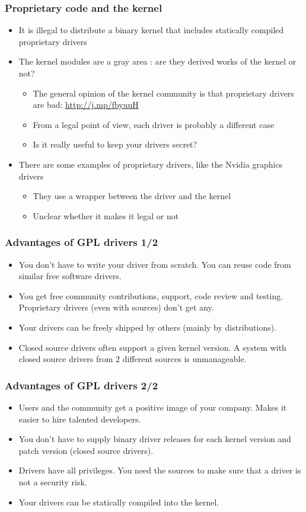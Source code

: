 \begin{frame}
  \frametitle{Proprietary code and the kernel}
  \begin{itemize}
  \item It is illegal to distribute a binary kernel that includes
    statically compiled proprietary drivers
  \item The kernel modules are a gray area : are they derived works of
    the kernel or not?
    \begin{itemize}
    \item The general opinion of the kernel community is that
      proprietary drivers are bad: \url{http://j.mp/fbyuuH}
    \item From a legal point of view, each driver is probably a
      different case
    \item Is it really useful to keep your drivers secret?
    \end{itemize}
  \item There are some examples of proprietary drivers, like the
    Nvidia graphics drivers
    \begin{itemize}
    \item They use a wrapper between the driver and the kernel
    \item Unclear whether it makes it legal or not
    \end{itemize}
  \end{itemize}
\end{frame}

\begin{frame}
  \frametitle{Advantages of GPL drivers 1/2}
  \begin{itemize}
  \item You don't have to write your driver from scratch. You can
    reuse code from similar free software drivers.
  \item You get free community contributions, support, code review and
    testing.  Proprietary drivers (even with sources) don't get any.
  \item Your drivers can be freely shipped by others (mainly by
    distributions).
  \item Closed source drivers often support a given kernel version. A
    system with closed source drivers from 2 different sources is
    unmanageable.
  \end{itemize}
\end{frame}

\begin{frame}
  \frametitle{Advantages of GPL drivers 2/2}
  \begin{itemize}
  \item Users and the community get a positive image of your
    company. Makes it easier to hire talented developers.
  \item You don't have to supply binary driver releases for each
    kernel version and patch version (closed source drivers).
  \item Drivers have all privileges. You need the sources to make sure
    that a driver is not a security risk.
  \item Your drivers can be statically compiled into the kernel.
  \end{itemize}
\end{frame}

